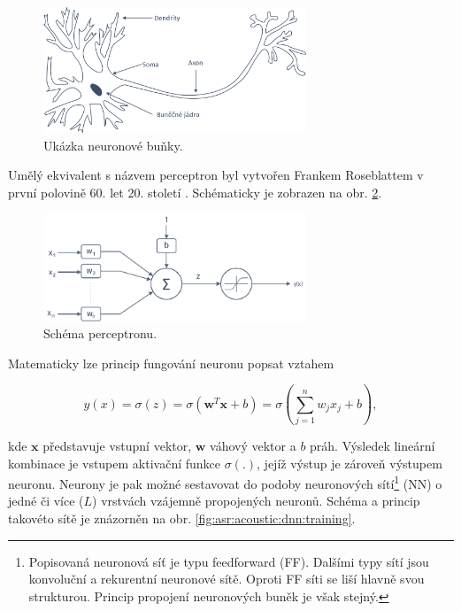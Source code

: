 \begin{figure}[hbpt]
  \centering
  \includegraphics[width=0.7\textwidth]{./ch4-asr/img/neuron-human.pdf}
  \caption{Ukázka neuronové buňky.}
  \label{fig:asr:acoustic:dnn:neuron:human}
\end{figure}

\noindent Umělý ekvivalent s názvem perceptron byl vytvořen Frankem Roseblattem v první polovině 60. let 20. století \cite{Rosenblatt1962}. Schématicky je zobrazen na obr. \ref{fig:asr:acoustic:dnn:neuron:artificial}.

\begin{figure}[hbpt]
  \centering
  \includegraphics[width=0.7\textwidth]{./ch4-asr/img/neuron.pdf}
  \caption{Schéma perceptronu.}
  \label{fig:asr:acoustic:dnn:neuron:artificial}
\end{figure}

\noindent Matematicky lze princip fungování neuronu popsat vztahem

\begin{equation}
  y\left(x\right) = \sigma\left(z\right) = \sigma \left(\boldsymbol{w}^{T}\boldsymbol{x} + b\right) = \sigma \left( \sum_{j=1}^{n} w_{j}x_{j} + b\right),
   \label{eq:asr:acoustic:dnn:neuron:output}
 \end{equation}

\noindent kde $\boldsymbol{x}$ představuje vstupní vektor, $\boldsymbol{w}$ váhový vektor a $b$ práh. Výsledek lineární kombinace je vstupem aktivační funkce $\sigma\left(.\right)$, jejíž výstup je zároveň výstupem neuronu. Neurony je pak možné sestavovat do podoby neuronových sítí\footnote{Popisovaná neuronová síť je typu feedforward (FF). Dalšími typy sítí jsou konvoluční a rekurentní neuronové sítě. Oproti FF síti se liší hlavně svou strukturou. Princip propojení neuronových buněk je však stejný.} (NN) o jedné či více ($L$) vrstvách vzájemně propojených neuronů. Schéma a princip takovéto sítě je znázorněn na obr. \ref{fig:asr:acoustic:dnn:training}.

